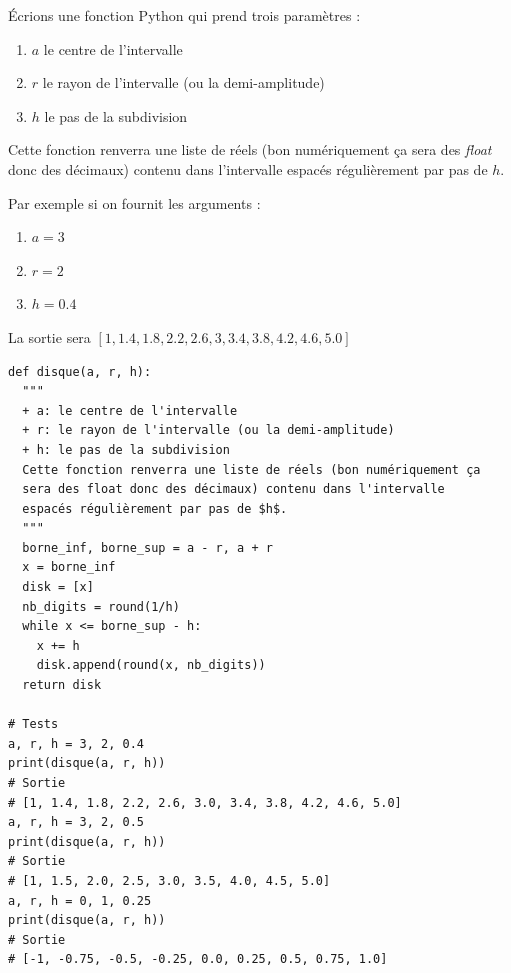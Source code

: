 \documentclass[a4paper, 11pt, twoside]{book}
\begin{document}
Écrions une fonction Python qui prend trois paramètres :
\begin{enumerate}
\item \(a\) le centre de l'intervalle
\item \(r\) le rayon de l'intervalle (ou la demi-amplitude)
\item \(h\) le pas de la subdivision
\end{enumerate}

Cette fonction renverra une liste de réels (bon numériquement ça
sera des \emph{float} donc des décimaux) contenu dans l'intervalle
espacés régulièrement par pas de \(h\).

Par exemple si on fournit les arguments :
\begin{enumerate}
\item \(a = 3\)
\item \(r = 2\)
\item \(h = 0.4\)
\end{enumerate}

La sortie sera \([1, 1.4, 1.8, 2.2, 2.6, 3, 3.4, 3.8, 4.2, 4.6,
    5.0]\)

\begin{verbatim}
def disque(a, r, h):
  """
  + a: le centre de l'intervalle
  + r: le rayon de l'intervalle (ou la demi-amplitude)
  + h: le pas de la subdivision
  Cette fonction renverra une liste de réels (bon numériquement ça
  sera des float donc des décimaux) contenu dans l'intervalle
  espacés régulièrement par pas de $h$.
  """
  borne_inf, borne_sup = a - r, a + r
  x = borne_inf
  disk = [x]
  nb_digits = round(1/h)
  while x <= borne_sup - h:
    x += h
    disk.append(round(x, nb_digits))
  return disk

# Tests
a, r, h = 3, 2, 0.4
print(disque(a, r, h))
# Sortie
# [1, 1.4, 1.8, 2.2, 2.6, 3.0, 3.4, 3.8, 4.2, 4.6, 5.0]
a, r, h = 3, 2, 0.5
print(disque(a, r, h))
# Sortie
# [1, 1.5, 2.0, 2.5, 3.0, 3.5, 4.0, 4.5, 5.0]
a, r, h = 0, 1, 0.25
print(disque(a, r, h))
# Sortie 
# [-1, -0.75, -0.5, -0.25, 0.0, 0.25, 0.5, 0.75, 1.0]
\end{verbatim}
\end{document}
